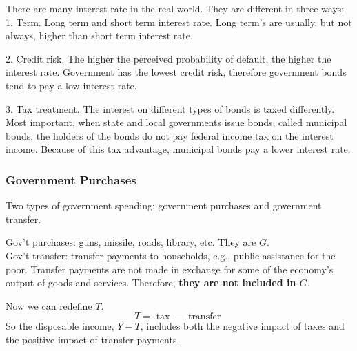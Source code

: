 \documentclass[12pt]{article}
\begin{document}
\begin{figure}[H]
\end{figure}

There are many interest rate in the real world. They are different in three ways:\\
1. Term. Long term and short term interest rate. Long term's are usually, but not always,
higher than short term interest rate.

2. Credit risk. The higher the perceived probability of default, the higher the interest
rate. Government has the lowest credit risk, therefore government bonds tend to pay
a low interest rate.

3. Tax treatment. The interest on different types of bonds is taxed differently. Most important, when state and local governments issue bonds, called municipal bonds, the holders of the bonds do not pay federal income
tax on the interest income. Because of this tax advantage, municipal bonds pay a lower interest rate.



\subsubsection{Government Purchases}
Two types of government spending: government purchases and government transfer.

Gov't purchases: guns, missile, roads, library, etc. They are $ G $.\\
Gov't transfer: transfer payments to households, e.g., public assistance for the poor.
Transfer payments are not made in exchange for some of the economy's output of goods
and services. Therefore, {\textbf {they are not included in $ G $}}.


Now we can redefine $ T $. 
\begin{equation*}
T = \text{ tax } - \text{ transfer }
\end{equation*}
So the disposable income, $ Y - T $, includes both the negative impact of taxes and 
the positive impact of transfer payments.
\end{document}

